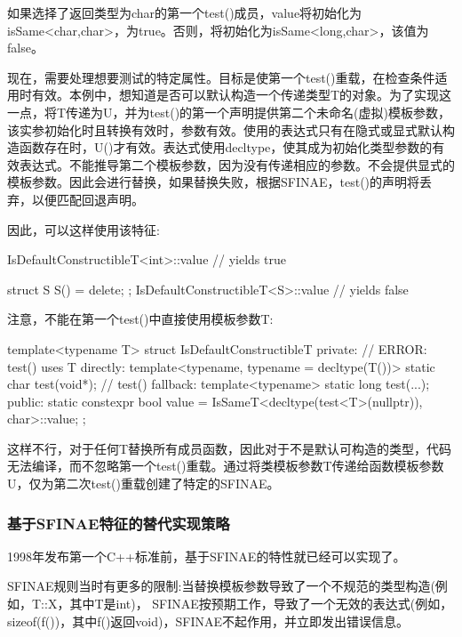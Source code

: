 如果选择了返回类型为char的第一个test()成员，value将初始化为isSame<char,char>，为true。否则，将初始化为isSame<long,char>，该值为false。

现在，需要处理想要测试的特定属性。目标是使第一个test()重载，在检查条件适用时有效。本例中，想知道是否可以默认构造一个传递类型T的对象。为了实现这一点，将T传递为U，并为test()的第一个声明提供第二个未命名(虚拟)模板参数，该实参初始化时且转换有效时，参数有效。使用的表达式只有在隐式或显式默认构造函数存在时，U()才有效。表达式使用decltype，使其成为初始化类型参数的有效表达式。不能推导第二个模板参数，因为没有传递相应的参数。不会提供显式的模板参数。因此会进行替换，如果替换失败，根据SFINAE，test()的声明将丢弃，以便匹配回退声明。

因此，可以这样使用该特征:

\begin{cpp}
IsDefaultConstructibleT<int>::value // yields true

struct S {
	S() = delete;
};
IsDefaultConstructibleT<S>::value // yields false
\end{cpp}

注意，不能在第一个test()中直接使用模板参数T:

\begin{cpp}
template<typename T>
struct IsDefaultConstructibleT {
	private:
	// ERROR: test() uses T directly:
	template<typename, typename = decltype(T())>
		static char test(void*);
	// test() fallback:
	template<typename>
		static long test(...);
	public:
	static constexpr bool value
		= IsSameT<decltype(test<T>(nullptr)), char>::value;
};
\end{cpp}

这样不行，对于任何T替换所有成员函数，因此对于不是默认可构造的类型，代码无法编译，而不忽略第一个test()重载。通过将类模板参数T传递给函数模板参数U，仅为第二次test()重载创建了特定的SFINAE。

\subsubsection{基于SFINAE特征的替代实现策略}

1998年发布第一个C++标准前，基于SFINAE的特性就已经可以实现了。

\begin{notice}SFINAE规则当时有更多的限制:当替换模板参数导致了一个不规范的类型构造(例如，T::X，其中T是int)， SFINAE按预期工作，导致了一个无效的表达式(例如，sizeof(f())，其中f()返回void)，SFINAE不起作用，并立即发出错误信息。
\end{notice}

